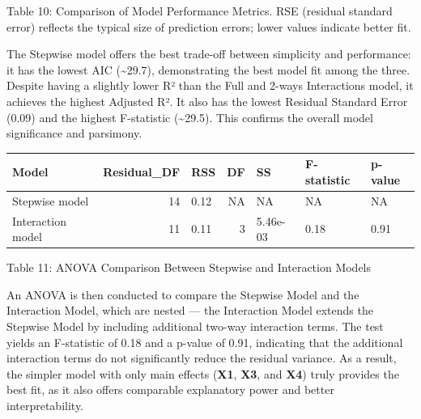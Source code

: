\documentclass[
  12pt,
]{article}
\begin{document}
\begin{center}
\vspace{-0.5em}
{\fontsize{12}{14}\selectfont Table 10: Comparison of Model Performance Metrics. RSE (residual standard error) reflects the typical size of prediction errors; lower values indicate better fit.\par}
\end{center}

The Stepwise model offers the best trade-off between simplicity and
performance: it has the lowest AIC (\textasciitilde29.7), demonstrating
the best model fit among the three. Despite having a slightly lower R²
than the Full and 2-ways Interactions model, it achieves the highest
Adjusted R². It also has the lowest Residual Standard Error (0.09) and
the highest F-statistic (\textasciitilde29.5). This confirms the overall
model significance and parsimony.

\begin{table}[!h]
\centering\begingroup\fontsize{8}{10}\selectfont

\begin{tabular}{lrlrlll}
\toprule
Model & Residual\_DF & RSS & DF & SS & F-statistic & p-value\\
\midrule
Stepwise model & 14 & 0.12 & NA & NA & NA & NA\\
Interaction model & 11 & 0.11 & 3 & 5.46e-03 & 0.18 & 0.91\\
\bottomrule
\end{tabular}
\endgroup{}
\end{table}

\begin{center}
\vspace{-1em}
{\fontsize{12}{14}\selectfont Table 11: ANOVA Comparison Between Stepwise and Interaction Models\par}
\end{center}

An ANOVA is then conducted to compare the Stepwise Model and the
Interaction Model, which are nested --- the Interaction Model extends
the Stepwise Model by including additional two-way interaction terms.
The test yields an F-statistic of 0.18 and a p-value of 0.91, indicating
that the additional interaction terms do not significantly reduce the
residual variance. As a result, the simpler model with only main effects
(\textbf{X1}, \textbf{X3}, and \textbf{X4}) truly provides the best fit,
as it also offers comparable explanatory power and better
interpretability. \vspace{-2em}
\end{document}
